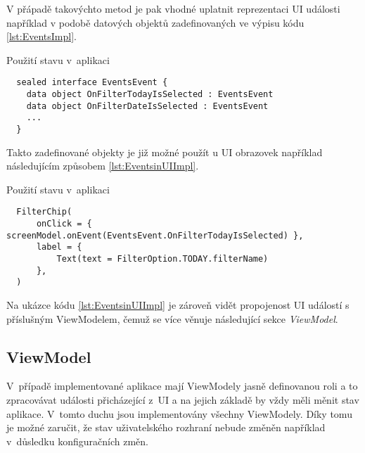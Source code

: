 V přápadě takovýchto metod je pak vhodné uplatnit reprezentaci UI události například v podobě datových objektů 
zadefinovaných ve výpisu kódu \ref{lst:EventsImpl}.

\begin{listing}[H]
\caption{Použití stavu v~aplikaci}\label{lst:EventsImpl}
\begin{verbatim}
  sealed interface EventsEvent {
    data object OnFilterTodayIsSelected : EventsEvent
    data object OnFilterDateIsSelected : EventsEvent
    ...
  }
\end{verbatim}
\end{listing}

Takto zadefinované objekty je již možné použít u UI obrazovek například následujícím způsobem \ref{lst:EventsinUIImpl}.

\begin{listing}[H]
\caption{Použití stavu v~aplikaci}\label{lst:EventsinUIImpl}
\begin{verbatim}
  FilterChip(
      onClick = { screenModel.onEvent(EventsEvent.OnFilterTodayIsSelected) },
      label = {
          Text(text = FilterOption.TODAY.filterName)
      },
  )
\end{verbatim}
\end{listing}

Na ukázce kódu \ref{lst:EventsinUIImpl} je zároveň vidět propojenost UI událostí s příslušným ViewModelem, čemuž se více věnuje následující
sekce \textit{ViewModel}.






\subsection{ViewModel} \label{ViewModelImpl}

V~případě implementované aplikace mají ViewModely jasně definovanou roli a to zpracovávat události přicházející z~UI a na jejich základě 
by vždy měli měnit stav aplikace. \cite{viewmodelEvents} V~tomto duchu jsou implementovány všechny ViewModely. Díky tomu je možné 
zaručit, že stav uživatelského rozhraní nebude změněn například v~důsledku konfiguračních změn. 

